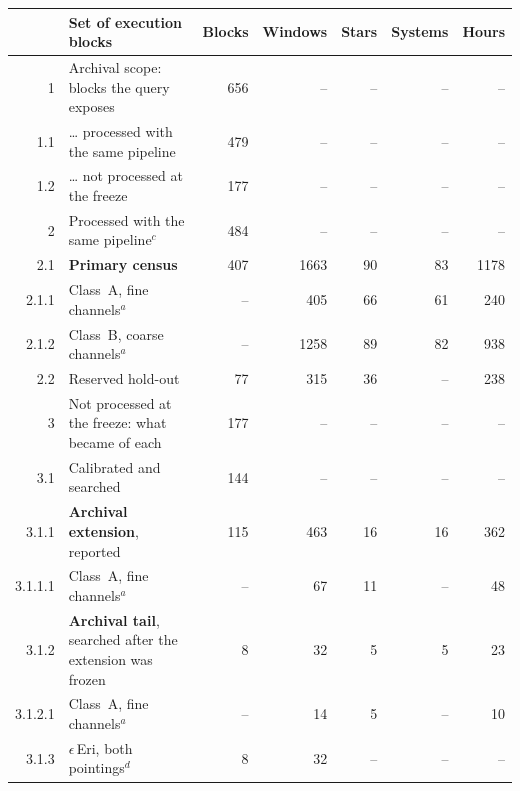 \begin{tabular}{@{}r@{~}p{}rrrrr@{}}
\hline
 & Set of execution blocks & Blocks & Windows & Stars & Systems & Hours \\
\hline
1 & Archival scope: blocks the query exposes & 656 & -- & -- & -- & -- \\
1.1 & \hspace{0.8em}\ldots{} processed with the same pipeline & 479 & -- & -- & -- & -- \\
1.2 & \hspace{0.8em}\ldots{} not processed at the freeze & 177 & -- & -- & -- & -- \\
\hline
2 & Processed with the same pipeline$^{c}$ & 484 & -- & -- & -- & -- \\
2.1 & \hspace{0.8em}\textbf{Primary census} & 407 & 1663 & 90 & 83 & 1178 \\
2.1.1 & \hspace{1.6em}Class~A, fine channels$^{a}$ & -- & 405 & 66 & 61 & 240 \\
2.1.2 & \hspace{1.6em}Class~B, coarse channels$^{a}$ & -- & 1258 & 89 & 82 & 938 \\
2.2 & \hspace{0.8em}Reserved hold-out & 77 & 315 & 36 & -- & 238 \\
\hline
3 & Not processed at the freeze: what became of each & 177 & -- & -- & -- & -- \\
3.1 & \hspace{0.8em}Calibrated and searched & 144 & -- & -- & -- & -- \\
3.1.1 & \hspace{1.6em}\textbf{Archival extension}, reported & 115 & 463 & 16 & 16 & 362 \\
3.1.1.1 & \hspace{2.4em}Class~A, fine channels$^{a}$ & -- & 67 & 11 & -- & 48 \\
3.1.2 & \hspace{1.6em}\textbf{Archival tail}, searched after the extension was frozen & 8 & 32 & 5 & 5 & 23 \\
3.1.2.1 & \hspace{2.4em}Class~A, fine channels$^{a}$ & -- & 14 & 5 & -- & 10 \\
3.1.3 & \hspace{1.6em}$\epsilon$\,Eri, both pointings$^{d}$ & 8 & 32 & -- & -- & -- \\

\end{tabular}
